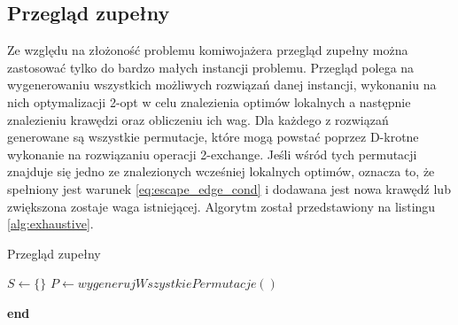 \newpage

\subsection{Przegląd zupełny}
Ze względu na złożoność problemu komiwojażera przegląd zupełny można zastosować tylko do bardzo małych instancji problemu.
Przegląd polega na wygenerowaniu wszystkich możliwych rozwiązań danej instancji, wykonaniu na nich optymalizacji 2-opt w celu znalezienia
optimów lokalnych a następnie znalezieniu krawędzi oraz obliczeniu ich wag. Dla każdego z rozwiązań generowane są wszystkie
permutacje, które mogą powstać poprzez D-krotne wykonanie na rozwiązaniu operacji 2-exchange. Jeśli wśród tych permutacji znajduje się jedno ze znalezionych wcześniej
lokalnych optimów, oznacza to, że spełniony jest warunek \ref{eq:escape_edge_cond} i dodawana jest nowa krawędź lub zwiększona zostaje waga istniejącej.
Algorytm został przedstawiony na listingu \ref{alg:exhaustive}.

\begin{algorithm}[]
    \caption{Przegląd zupełny}\label{alg:exhaustive}
    $S \gets \{\}$\;
    $P \gets wygenerujWszystkiePermutacje()$\;




    \vspace{1em}

    \textbf{end}

\end{algorithm}

